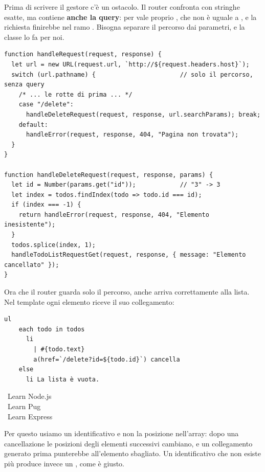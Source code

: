 Prima di scrivere il gestore c'è un ostacolo. Il router confronta
 con stringhe esatte, ma  contiene
\textbf{anche la query}: per  vale proprio
, che non è uguale a , e la richiesta
finirebbe nel ramo . Bisogna separare il percorso dai parametri, e
la classe  lo fa per noi.

\begin{lstlisting}[style=js, name=app.js]
function handleRequest(request, response) {
  let url = new URL(request.url, `http://${request.headers.host}`);
  switch (url.pathname) {                       // solo il percorso, senza query
    /* ... le rotte di prima ... */
    case "/delete":
      handleDeleteRequest(request, response, url.searchParams); break;
    default:
      handleError(request, response, 404, "Pagina non trovata");
  }
}

function handleDeleteRequest(request, response, params) {
  let id = Number(params.get("id"));            // "3" -> 3
  let index = todos.findIndex(todo => todo.id === id);
  if (index === -1) {
    return handleError(request, response, 404, "Elemento inesistente");
  }
  todos.splice(index, 1);
  handleTodoListRequestGet(request, response, { message: "Elemento cancellato" });
}
\end{lstlisting}

Ora che il router guarda solo il percorso, anche  arriva
correttamente alla lista. Nel template ogni elemento riceve il suo
collegamento:

\begin{affianco}[0.55][c]
\begin{lstlisting}[style=pug, name=templates/todo.pug]
  ul
    each todo in todos
      li
        | #{todo.text}
        a(href=`/delete?id=${todo.id}`) cancella
    else
      li La lista è vuota.
\end{lstlisting}
\risultato
\begin{browser}
  \textbullet\ Learn Node.js \\
  \textbullet\ Learn Pug \\
  \textbullet\ Learn Express 
\end{browser}
\end{affianco}

Per questo usiamo un identificativo e non la posizione nell'array: dopo una
cancellazione le posizioni degli elementi successivi cambiano, e un collegamento
generato prima punterebbe all'elemento sbagliato. Un identificativo che non
esiste più produce invece un , come è giusto.

